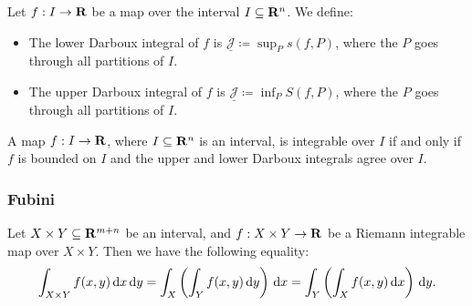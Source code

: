 \begin{definition}
    \label{def:upper-lower-darboux}
    Let \(f: I \to \mathbf{R}\) be a map over the interval \(I \subseteq \mathbf{R}^n\). We define:
    \begin{itemize}\setlength\itemsep{0em}
        \item The lower Darboux integral of \(f\) is \(\underline{\mathcal{J}} \coloneq
              \sup_P s(f, P)\), where the \(P\) goes through all partitions of \(I\).

        \item The upper Darboux integral of \(f\) is \(\underline{\mathcal{J}} \coloneq
              \inf_P S(f, P)\), where the \(P\) goes through all partitions of \(I\).
    \end{itemize}
\end{definition}

\begin{theorem}
    \label{thm:darboux-criterion}
    A map \(f: I \to \mathbf{R}\), where \(I \subseteq \mathbf{R}^n\) is an interval, is integrable
    over \(I\) if and only if \(f\) is bounded on \(I\) and the upper and lower
    Darboux integrals agree over \(I\).
\end{theorem}


\subsubsection{Fubini}

\begin{theorem}
    \label{thm:fubini}
    Let \(X \times Y \subseteq \mathbf{R}^{m + n}\) be an interval, and \(f: X \times Y \to
    \mathbf{R}\) be a Riemann integrable map over \(X \times Y\). Then we have the following
    equality:
    \begin{equation}
        \label{eq:fubini}
        \int_{X \times Y} f(x, y)\, \mathrm{d} x\, \mathrm{d} y
        = \int_X \left( \int_Y f(x, y)\, \mathrm{d} y\right)\, \mathrm{d} x
        = \int_Y \left( \int_X f(x, y)\, \mathrm{d} x\right)\, \mathrm{d} y.
    \end{equation}
\end{theorem}

